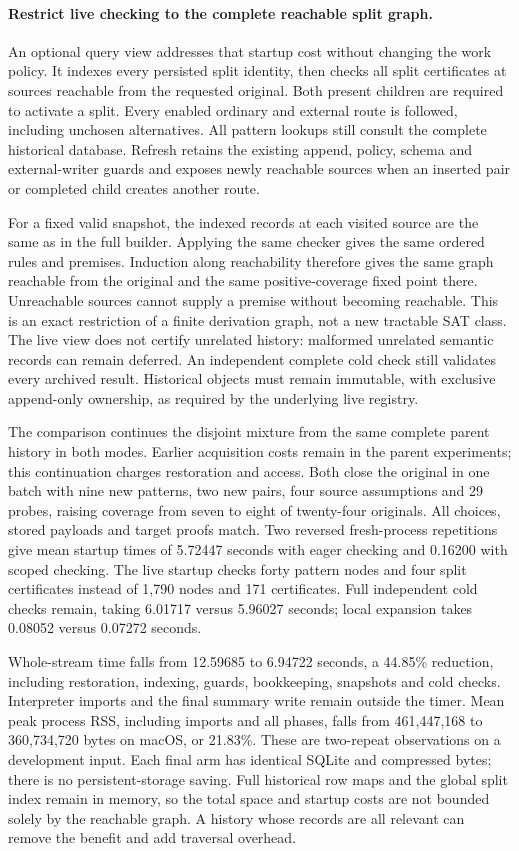 \documentclass[11pt,a4paper]{article}
\numberwithin{equation}{section}
\theoremstyle{plain}
\theoremstyle{definition}
\theoremstyle{remark}
\begin{document}
\paragraph{Restrict live checking to the complete reachable split graph.}
An optional query view addresses that startup cost without changing the work
policy. It indexes every persisted split identity, then checks all split
certificates at sources reachable from the requested original. Both present
children are required to activate a split. Every enabled ordinary and external
route is followed, including unchosen alternatives. All pattern lookups still
consult the complete historical database. Refresh retains the existing append,
policy, schema and external-writer guards and exposes newly reachable sources
when an inserted pair or completed child creates another route.

For a fixed valid snapshot, the indexed records at each visited source are the
same as in the full builder. Applying the same checker gives the same ordered
rules and premises. Induction along reachability therefore gives the same graph
reachable from the original and the same positive-coverage fixed point there.
Unreachable sources cannot supply a premise without becoming reachable. This is
an exact restriction of a finite derivation graph, not a new tractable SAT class.
The live view does not certify unrelated history: malformed unrelated semantic
records can remain deferred. An independent complete cold check still validates
every archived result. Historical objects must remain immutable, with exclusive
append-only ownership, as required by the underlying live registry.

The comparison continues the disjoint mixture from the same complete parent
history in both modes. Earlier acquisition costs remain in the parent experiments;
this continuation charges restoration and access. Both close the original in one batch with nine new
patterns, two new pairs, four source assumptions and 29 probes, raising coverage
from seven to eight of twenty-four originals. All choices, stored payloads and
target proofs match. Two reversed fresh-process repetitions give mean startup
times of 5.72447 seconds with eager checking and 0.16200 with scoped checking.
The live startup checks forty pattern nodes and four split certificates instead
of 1,790 nodes and 171 certificates. Full independent cold checks remain, taking
6.01717 versus 5.96027 seconds; local expansion takes 0.08052 versus 0.07272 seconds.

Whole-stream time falls from 12.59685 to 6.94722 seconds, a 44.85\% reduction,
including restoration, indexing, guards, bookkeeping, snapshots and cold checks.
Interpreter imports and the final summary write remain outside the timer.
Mean peak process RSS, including imports and all phases, falls from 461,447,168
to 360,734,720 bytes on macOS, or 21.83\%. These are two-repeat observations on a
development input. Each final arm has identical SQLite and compressed bytes;
there is no persistent-storage saving. Full historical row maps and the global
split index remain in memory, so the total space and startup costs are not
bounded solely by the reachable graph. A history whose records are all relevant
can remove the benefit and add traversal overhead.
\end{document}
